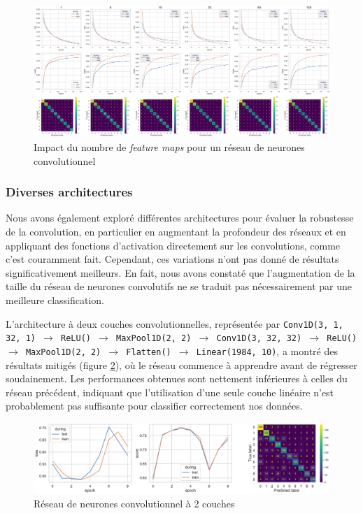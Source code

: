 \documentclass{article}
\begin{document}
\begin{figure}[htbp]
    \centering
    \includegraphics[width=\textwidth]{conv/conv_feature_maps.pdf}
    \caption{Impact du nombre de \textit{feature maps} pour un réseau de neurones convolutionnel}
    \label{fig:convchanout}
\end{figure}

\subsubsection{Diverses architectures}

Nous avons également exploré différentes architectures pour évaluer la robustesse de la convolution, en particulier en augmentant la profondeur des réseaux et en appliquant des fonctions d'activation directement sur les convolutions, comme c'est couramment fait. Cependant, ces variations n'ont pas donné de résultats significativement meilleurs. En fait, nous avons constaté que l'augmentation de la taille du réseau de neurones convolutifs ne se traduit pas nécessairement par une meilleure classification.

L'architecture à deux couches convolutionnelles, représentée par \texttt{Conv1D(3, 1, 32, 1) $\rightarrow$ ReLU() $\rightarrow$ MaxPool1D(2, 2) $\rightarrow$ Conv1D(3, 32, 32) $\rightarrow$ ReLU() $\rightarrow$ MaxPool1D(2, 2) $\rightarrow$ Flatten() $\rightarrow$ Linear(1984, 10)}, a montré des résultats mitigés (figure \ref{fig:conv2layers}), où le réseau commence à apprendre avant de régresser soudainement. Les performances obtenues sont nettement inférieures à celles du réseau précédent, indiquant que l'utilisation d'une seule couche linéaire n'est probablement pas suffisante pour classifier correctement nos données.

\begin{figure}[htbp]
    \centering
    \includegraphics[width=\textwidth]{conv/conv_2layers.pdf}
    \caption{Réseau de neurones convolutionnel à 2 couches}
    \label{fig:conv2layers}
\end{figure}
\end{document}
